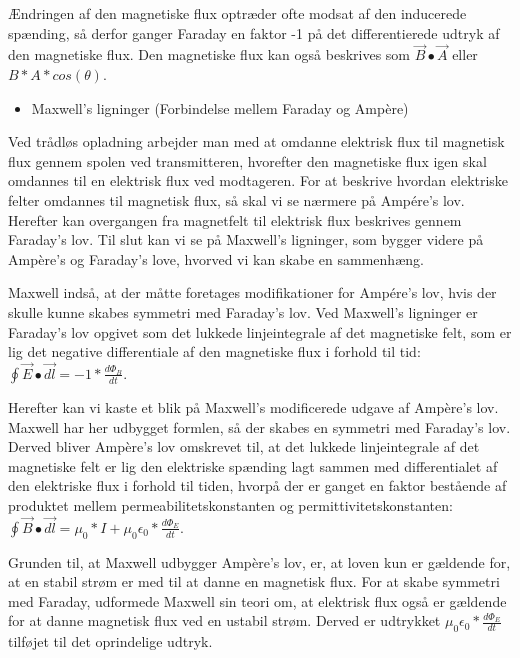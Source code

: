 Ændringen af den magnetiske flux optræder ofte modsat af den inducerede spænding, så derfor ganger Faraday en faktor -1 på det differentierede udtryk af den magnetiske flux. Den magnetiske flux kan også beskrives som $\vec{B} \bullet \vec{A}$ eller $B * A * cos(\theta)$.
\begin{itemize}
\item Maxwell's ligninger (Forbindelse mellem Faraday og Ampère)
\end{itemize}
Ved trådløs opladning arbejder man med at omdanne elektrisk flux til magnetisk flux gennem spolen ved transmitteren, hvorefter den magnetiske flux igen skal omdannes til en elektrisk flux ved modtageren. For at beskrive hvordan elektriske felter omdannes til magnetisk flux, så skal vi se nærmere på Ampére's lov. Herefter kan overgangen fra magnetfelt til elektrisk flux beskrives gennem Faraday's lov. Til slut kan vi se på Maxwell's ligninger, som bygger videre på Ampère's og Faraday's love, hvorved vi kan skabe en sammenhæng.

Maxwell indså, at der måtte foretages modifikationer for Ampére's lov, hvis der skulle kunne skabes symmetri med Faraday's lov. Ved Maxwell's ligninger er Faraday's lov opgivet som det lukkede linjeintegrale af det magnetiske felt, som er lig det negative differentiale af den magnetiske flux i forhold til tid: $\oint \vec{E} \bullet \vec{dl} = -1 * \frac{d \Phi_B}{dt}$.

Herefter kan vi kaste et blik på Maxwell's modificerede udgave af Ampère's lov. Maxwell har her udbygget formlen, så der skabes en symmetri med Faraday's lov. Derved bliver Ampère's lov omskrevet til, at det lukkede linjeintegrale af det magnetiske felt er lig den elektriske spænding lagt sammen med differentialet af den elektriske flux i forhold til tiden, hvorpå der er ganget en faktor bestående af produktet mellem permeabilitetskonstanten og permittivitetskonstanten: $\oint \vec{B} \bullet \vec{dl} = \mu_0 * I + \mu_0 \epsilon_0 * \frac{d \Phi_E}{dt}$.

Grunden til, at Maxwell udbygger Ampère's lov, er, at loven kun er gældende for, at en stabil strøm er med til at danne en magnetisk flux. For at skabe symmetri med Faraday, udformede Maxwell sin teori om, at elektrisk flux også er gældende for at danne magnetisk flux ved en ustabil strøm. Derved er udtrykket $\mu_0 \epsilon_0 * \frac{d \Phi_E}{dt}$ tilføjet til det oprindelige udtryk.
